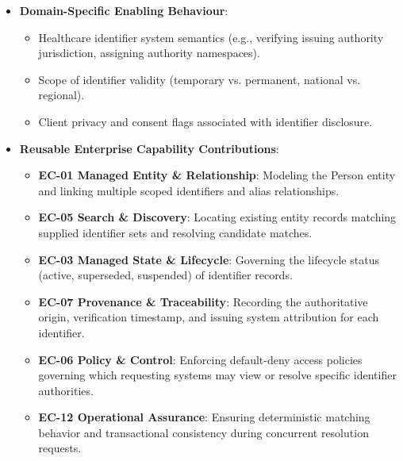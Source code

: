 \begin{itemize}

\item
\textbf{Domain-Specific Enabling Behaviour}:


\begin{itemize}

\item
Healthcare identifier system semantics (e.g., verifying issuing authority jurisdiction, assigning authority namespaces).



\item
Scope of identifier validity (temporary vs. permanent, national vs. regional).



\item
Client privacy and consent flags associated with identifier disclosure.



\end{itemize}


\item
\textbf{Reusable Enterprise Capability Contributions}:


\begin{itemize}

\item
\textbf{EC-01 Managed Entity \& Relationship}: Modeling the Person entity and linking multiple scoped identifiers and alias relationships.



\item
\textbf{EC-05 Search \& Discovery}: Locating existing entity records matching supplied identifier sets and resolving candidate matches.



\item
\textbf{EC-03 Managed State \& Lifecycle}: Governing the lifecycle status (active, superseded, suspended) of identifier records.



\item
\textbf{EC-07 Provenance \& Traceability}: Recording the authoritative origin, verification timestamp, and issuing system attribution for each identifier.



\item
\textbf{EC-06 Policy \& Control}: Enforcing default-deny access policies governing which requesting systems may view or resolve specific identifier authorities.



\item
\textbf{EC-12 Operational Assurance}: Ensuring deterministic matching behavior and transactional consistency during concurrent resolution requests.



\end{itemize}


\end{itemize}
\label{rad:tier-model:208}

